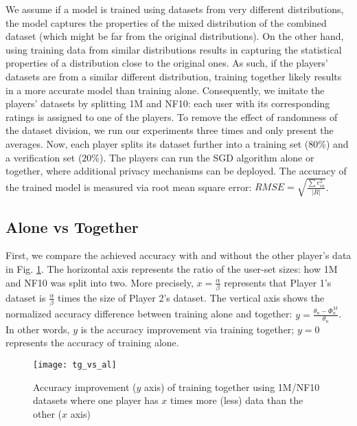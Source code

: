 \documentclass[USenglish,oneside,twocolumn]{article}
\theoremstyle{plain}
\begin{document}
    We assume if a model is trained using datasets from very different distributions, the model captures the properties of the mixed distribution of the combined dataset (which might be far from the original distributions). On the other hand, using training data from similar distributions results in capturing the statistical properties of a distribution close to the original ones. As such, if the players' datasets are from a similar different distribution, training together likely results in a more accurate model than training alone. Consequently, we imitate the players' datasets by splitting 1M and NF10: each user with its corresponding ratings is assigned to one of the players. To remove the effect of randomness of the dataset division, we run our experiments three times and only present the averages. Now, each player splits its dataset further into a training set ($80\%$) and a verification set ($20\%$). The players can run the SGD algorithm alone or together, where additional privacy mechanisms can be deployed. The accuracy of the trained model is measured via root mean square error: $RMSE=\sqrt{\frac{\sum e_{iu}^2}{|R|}}$.
    
    \vspace{-0.5cm}
    \subsection{Alone vs Together}
    \label{sec:exp_alone}
    \vspace{-0.25cm}
    
    First, we compare the achieved accuracy with and without the other player's data in Fig. \ref{fig:size}. The horizontal axis represents the ratio of the user-set sizes: how 1M and NF10 was split into two. More precisely, $x=\frac{\alpha}{\beta}$ represents that Player 1's dataset  is $\frac{\alpha}{\beta}$ times the size of Player 2's dataset. The vertical axis shows the normalized accuracy difference between training alone and together: $y=\frac{\theta_n-\Phi_n^M}{\theta_n}$. In other words, $y$ is the accuracy improvement via training together; $y=0$ represents the accuracy of training alone.
    
    \pagebreak
    \vspace{-0.0cm}
    \begin{figure}[h]
        \centering
        \texttt{[image: tg\_vs\_al]}
        \caption{Accuracy improvement ($y$ axis) of training together using 1M/NF10 datasets where one player has $x$ times more (less) data than the other ($x$ axis)}
        \label{fig:size}
    \end{figure}
    \vspace{-0.25cm}
    
\end{document}
